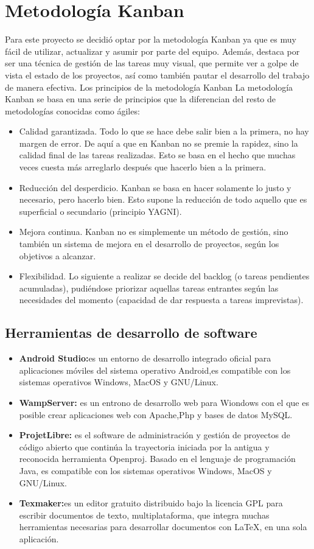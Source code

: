 \documentclass[letterpaper,12pt,openany,oneside]{book}
\begin{document}
\chapter{Metodología Kanban}

Para este proyecto se decidió optar por la metodología Kanban ya que es muy fácil de utilizar, actualizar y asumir por parte del equipo. Además, destaca por ser una técnica de gestión de las tareas muy visual, que permite ver a golpe de vista el estado de los proyectos, así como también pautar el desarrollo del trabajo de manera efectiva.
Los principios de la metodología Kanban
La metodología Kanban se basa en una serie de principios que la diferencian del resto de metodologías conocidas como ágiles:
\flushleft
\begin{itemize}

\item Calidad garantizada. Todo lo que se hace debe salir bien a la primera, no hay margen de error. De aquí a que en Kanban no se premie la rapidez, sino la calidad final de las tareas realizadas. Esto se basa en el hecho que muchas veces cuesta más arreglarlo después que hacerlo bien a la primera.
\item Reducción del desperdicio. Kanban se basa en hacer solamente lo justo y necesario, pero hacerlo bien. Esto supone la reducción de todo aquello que es superficial o secundario (principio YAGNI).
\item Mejora continua. Kanban no es simplemente un método de gestión, sino también un sistema de mejora en el desarrollo de proyectos, según los objetivos a alcanzar.
\item Flexibilidad. Lo siguiente a realizar se decide del backlog (o tareas pendientes acumuladas), pudiéndose priorizar aquellas tareas entrantes según las necesidades del momento (capacidad de dar respuesta a tareas imprevistas). 
\end{itemize}
\section{Herramientas de desarrollo de software}
\begin{itemize}
\item \textbf{Android Studio:}es un entorno de desarrollo integrado oficial para aplicaciones móviles del sistema operativo Android,es compatible con los sistemas operativos Windows, MacOS y GNU/Linux.
\item \textbf{WampServer:} es un entrono de desarrollo web para Wiondows con el que es posible crear aplicaciones web con Apache,Php y bases de datos MySQL.
\item \textbf{ProjetLibre:} es el software de administración y gestión de proyectos de código abierto que continúa la trayectoria iniciada por la antigua y reconocida herramienta Openproj. Basado en el lenguaje de programación Java, es compatible con los sistemas operativos Windows, MacOS y GNU/Linux.
\item \textbf{Texmaker:}es un editor gratuito distribuido bajo la licencia GPL para escribir documentos de texto, multiplataforma, que integra muchas herramientas necesarias para desarrollar documentos con LaTeX, en una sola aplicación. 
\end{itemize}
\end{document}
